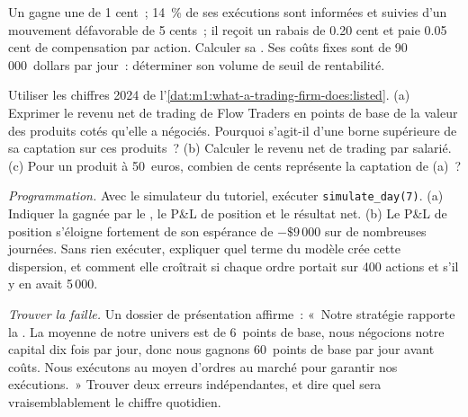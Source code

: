 \begin{exercise}[$\star\star$]\label{exo:m1:what-a-trading-firm-does:5}
Un  gagne une  de 1 cent~; 14~\% de ses exécutions sont
informées et suivies d'un mouvement défavorable de 5 cents~; il reçoit un rabais de
0.20 cent et paie 0.05 cent de compensation par action. Calculer sa .
Ses coûts fixes sont de 90\,000~dollars par jour~: déterminer son volume de seuil de rentabilité.
\end{exercise}

\begin{exercise}[$\star\star$]\label{exo:m1:what-a-trading-firm-does:6}
Utiliser les chiffres 2024 de
l'\cref{dat:m1:what-a-trading-firm-does:listed}. (a) Exprimer le revenu net de trading de Flow Traders
en points de base de la valeur des produits cotés qu'elle a
négociés. Pourquoi s'agit-il d'une borne supérieure de sa captation sur ces produits~?
(b) Calculer le revenu net de trading par salarié. (c) Pour un produit à 50~euros, combien de
cents représente la captation de (a)~?
\end{exercise}

\begin{exercise}[$\star\star\star$]\label{exo:m1:what-a-trading-firm-does:7}
\emph{Programmation.} Avec le simulateur du tutoriel, exécuter \texttt{simulate\_day(7)}.
(a) Indiquer la  gagnée par le , le P\&L de position et le
résultat net. (b) Le P\&L de position s'éloigne fortement de son espérance de $-\$9\,000$ sur de nombreuses journées.
Sans rien exécuter, expliquer quel terme du modèle crée cette
dispersion, et comment elle croîtrait si chaque ordre portait sur 400 actions et
s'il y en avait 5\,000.
\end{exercise}

\begin{exercise}[$\star\star\star$]\label{exo:m1:what-a-trading-firm-does:8}
\emph{Trouver la faille.} Un dossier de présentation affirme~: «~Notre stratégie rapporte la
. La  moyenne de notre univers est de 6~points de base, nous négocions notre
capital dix fois par jour, donc nous gagnons 60~points de base par jour avant coûts. Nous
exécutons au moyen d'ordres au marché pour garantir nos exécutions.~» Trouver deux erreurs
indépendantes, et dire quel sera vraisemblablement le chiffre quotidien.
\end{exercise}

